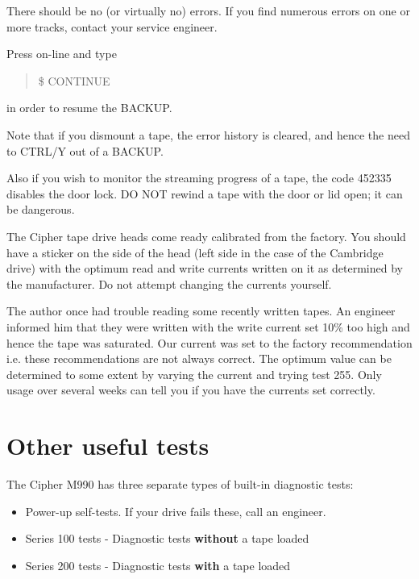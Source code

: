 There should be no (or virtually no) errors. If you find numerous errors
on one or more tracks, contact your service engineer.

Press on-line and type

\begin{quote}

\$ CONTINUE

\end{quote}

in order to resume the BACKUP.

Note that if you dismount a tape, the error history is cleared, and
hence the need to CTRL/Y out of a BACKUP.

Also if you wish to monitor the streaming progress of a tape,
the code 452335 disables the door lock. DO NOT rewind a tape with
the door or lid open; it can be dangerous.

The Cipher tape drive heads come ready calibrated from the factory. You should
have a sticker on the side of the head (left side in the case of the Cambridge
drive) with the optimum read and write currents written on it as determined by
the manufacturer. Do not attempt changing the currents yourself.

The author once had trouble reading some recently written tapes.
An engineer informed him that they were written with the write current set
10\% too high and hence the tape was saturated. Our current was set to the
factory recommendation i.e. these recommendations are not always correct.
The optimum value can be determined to some extent by varying the current
and trying test 255. Only usage over several weeks
can tell you if you have the currents set correctly.

\section{Other useful tests}

The Cipher M990 has three separate types of built-in diagnostic tests:

\begin{itemize}

\item Power-up self-tests. If your drive fails these, call an engineer.

\item Series 100 tests - Diagnostic tests {\bf without} a tape loaded

\item Series 200 tests - Diagnostic tests {\bf with} a tape loaded

\end {itemize}

